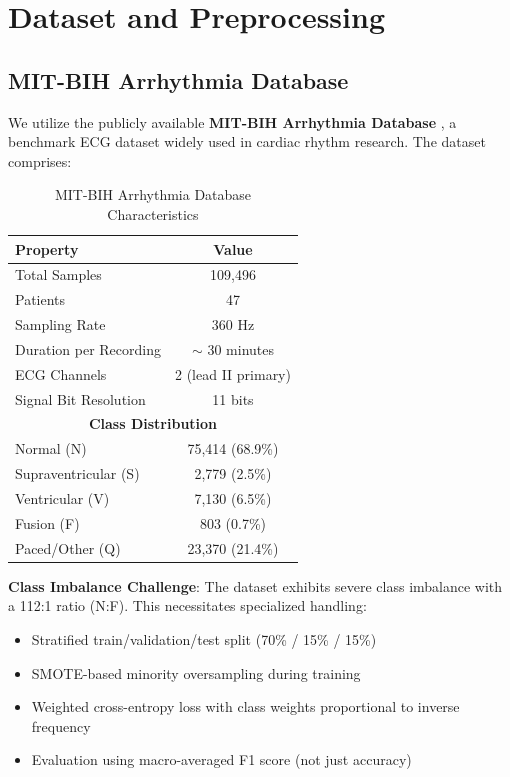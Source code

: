 \documentclass[12pt, a4paper]{article}
\begin{document}
\section{Dataset and Preprocessing}

\subsection{MIT-BIH Arrhythmia Database}

We utilize the publicly available \textbf{MIT-BIH Arrhythmia Database} \cite{moody2001impact}, a benchmark ECG dataset widely used in cardiac rhythm research. The dataset comprises:

\begin{table}[H]
\centering
\caption{MIT-BIH Arrhythmia Database Characteristics}
\begin{tabular}{lc}
\toprule
\textbf{Property} & \textbf{Value} \\
\midrule
Total Samples & 109,496 \\
Patients & 47 \\
Sampling Rate & 360 Hz \\
Duration per Recording & $\sim$ 30 minutes \\
ECG Channels & 2 (lead II primary) \\
Signal Bit Resolution & 11 bits \\
\midrule
\multicolumn{2}{c}{\textbf{Class Distribution}} \\
\midrule
Normal (N) & 75,414 (68.9\%) \\
Supraventricular (S) & 2,779 (2.5\%) \\
Ventricular (V) & 7,130 (6.5\%) \\
Fusion (F) & 803 (0.7\%) \\
Paced/Other (Q) & 23,370 (21.4\%) \\
\bottomrule
\end{tabular}
\label{tab:dataset}
\end{table}

\textbf{Class Imbalance Challenge}: The dataset exhibits severe class imbalance with a 112:1 ratio (N:F). This necessitates specialized handling:
\begin{itemize}
    \item Stratified train/validation/test split (70\% / 15\% / 15\%)
    \item SMOTE-based minority oversampling during training
    \item Weighted cross-entropy loss with class weights proportional to inverse frequency
    \item Evaluation using macro-averaged F1 score (not just accuracy)
\end{itemize}
\end{document}
